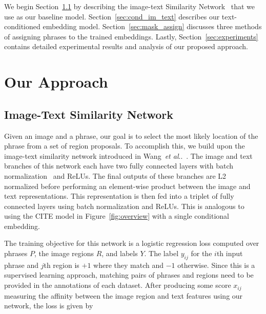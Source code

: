 \documentclass[runningheads]{llncs}
\makeatletter
\DeclareRobustCommand\onedot{\futurelet\@let@token\@onedot}
\def\@onedot{\ifx\@let@token.\else.\null\fi\xspace}
\def\etal{\emph{et al}\onedot}
\makeatother
\begin{document}
We begin Section~\ref{sec:image-text_embed} by describing the image-text Similarity Network~\cite{wangTwoBranch2017} that we use as our baseline model.  Section~\ref{sec:cond_im_text} describes our text-conditioned embedding model.  Section~\ref{sec:mask_assign} discusses three methods of assigning phrases to the trained embeddings.  Lastly, Section~\ref{sec:experiments} contains detailed experimental results and analysis of our proposed approach.


\section{Our Approach}\subsection{Image-Text Similarity Network}\label{sec:image-text_embed}
Given an image and a phrase, our goal is to select the most likely location of the phrase from a set of region proposals.  To accomplish this, we build upon the image-text similarity network introduced in Wang~\etal~\cite{wangTwoBranch2017}.  The image and text branches of this network each have two fully connected layers with batch normalization~\cite{Ioffe:2015:BNA:3045118.3045167} and ReLUs.  The final outputs of these branches are L2 normalized before performing an element-wise product between the image and text representations.  This representation is then fed into a triplet of fully connected layers using batch normalization and ReLUs.  This is analogous to using the CITE model in Figure~\ref{fig:overview} with a single conditional embedding.

The training objective for this network is a logistic regression loss computed over phrases $P$, the image regions $R$, and labels $Y$. The label $y_{ij}$ for the $i$th input phrase and $j$th region is $+1$  where they match and $-1$ otherwise.  Since this is a supervised learning approach, matching pairs of phrases and regions need to be provided in the annotations of each dataset.  After producing some score $x_{ij}$ measuring the affinity between the image region and text features using our network, the loss is given by
\end{document}
